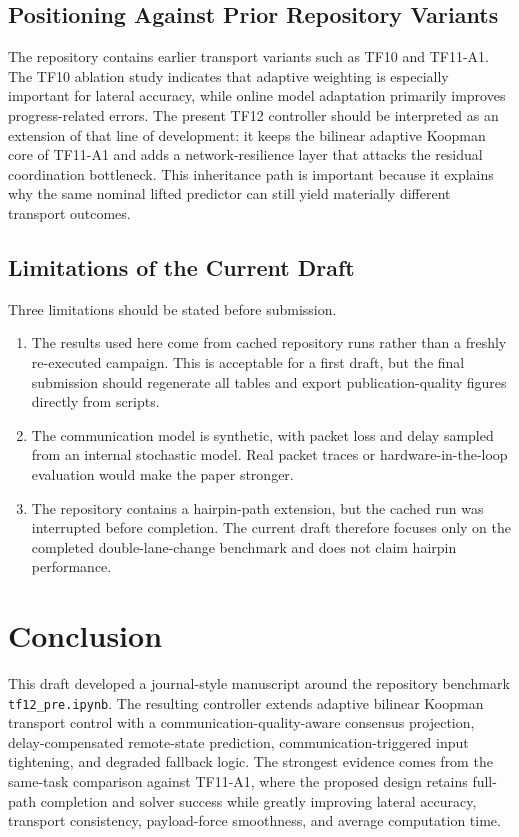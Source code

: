 \documentclass[twocolumn,3p,times,procedia]{elsarticle}
\newcommand{\tfone}{TF11-A1}
\newcommand{\tftwo}{TF12}
\begin{document}
\subsection{Positioning Against Prior Repository Variants}
The repository contains earlier transport variants such as TF10 and \tfone{}. The TF10 ablation study indicates that adaptive weighting is especially important for lateral accuracy, while online model adaptation primarily improves progress-related errors. The present \tftwo{} controller should be interpreted as an extension of that line of development: it keeps the bilinear adaptive Koopman core of \tfone{} and adds a network-resilience layer that attacks the residual coordination bottleneck. This inheritance path is important because it explains why the same nominal lifted predictor can still yield materially different transport outcomes.

\subsection{Limitations of the Current Draft}
Three limitations should be stated before submission.
\begin{enumerate}
    \item The results used here come from cached repository runs rather than a freshly re-executed campaign. This is acceptable for a first draft, but the final submission should regenerate all tables and export publication-quality figures directly from scripts.
    \item The communication model is synthetic, with packet loss and delay sampled from an internal stochastic model. Real packet traces or hardware-in-the-loop evaluation would make the paper stronger.
    \item The repository contains a hairpin-path extension, but the cached run was interrupted before completion. The current draft therefore focuses only on the completed double-lane-change benchmark and does not claim hairpin performance.
\end{enumerate}

\section{Conclusion}
This draft developed a journal-style manuscript around the repository benchmark \texttt{tf12\_pre.ipynb}. The resulting controller extends adaptive bilinear Koopman transport control with a communication-quality-aware consensus projection, delay-compensated remote-state prediction, communication-triggered input tightening, and degraded fallback logic. The strongest evidence comes from the same-task comparison against \tfone{}, where the proposed design retains full-path completion and solver success while greatly improving lateral accuracy, transport consistency, payload-force smoothness, and average computation time.
\end{document}
